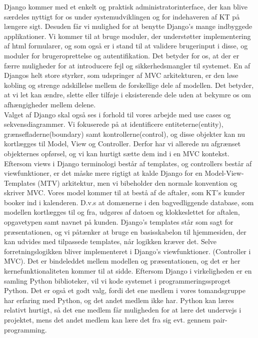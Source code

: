 \documentclass[12pt]{article}   %
\begin{document}
Django kommer med et enkelt og praktisk administratorinterface, der kan blive
særdeles nyttigt for os under systemudviklingen og for indehaveren af KT på længere sigt. Desuden får vi mulighed for at benytte Django's mange indbyggede applikationer. Vi kommer til at bruge moduler, der understøtter implementering af html formularer, og som også er i stand til at validere brugerinput i disse, og moduler for brugeroprettelse og autentifikation. Det betyder for os, at der er
færre muligheder for at introducere fejl og sikkerhedsmangler til systemet. En af Djangos helt store styrker, som udspringer af MVC arkitekturen, er den løse kobling og strenge adskillelse mellem de forskellige dele af modellen. Det betyder, at vi let kan ændre, slette eller tilføje i eksisterende dele uden at bekymre os om afhængigheder mellem delene. \\
Valget af Django skal også ses i forhold til vores arbejde med use cases og sekvensdiagrammer. Vi fokuserede på at identificere entiteterne(entity), grænsefladerne(boundary) samt kontrollerne(control), og disse objekter kan nu kortlægges til Model, View og Controller. Derfor har vi allerede nu afgrænset objekternes opførsel, og vi kan hurtigt sætte dem ind i en MVC kontekst. \\
Eftersom views i Django terminologi består af templates, og controllers består af viewfunktioner, er det måske mere rigtigt at kalde Django for en Model-View-Templates
(MTV) arkitektur, men vi bibeholder den normale konvention og skriver MVC. Vores model kommer til at bestå af de aftaler, som KT's kunder booker ind i kalenderen. D.v.s at domænerne i den bagvedliggende database, som modellen kortlægges til og 
fra, udgøres af datoen og klokkeslettet for aftalen, opgavetypen samt navnet på kunden. Django's templates står som sagt for præsentationen, og vi påtænker at bruge en basisskabelon til hjemmesiden, der kan udvides med
tilpassede templates, når logikken kræver det. Selve forretningslogikken bliver implementeret i Django's viewfunktioner. (Controller i MVC). Det er bindeleddet
mellem modellen og præsentationen, og det er her kernefunktionaliteten kommer til at sidde. Eftersom Django i virkeligheden er en samling Python biblioteker, vil vi kode 
systemet i programmeringssproget Python. Det er også et godt valg, fordi det ene medlem i vores tomandsgruppe har erfaring med Python, og det andet medlem ikke har. Python kan læres relativt hurtigt, så det ene medlem får muligheden for at
lære det undervejs i projektet, mens det andet medlem kan lære det fra sig evt. gennem pair-programming. \\ 
\end{document}
